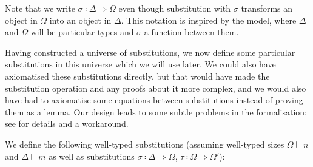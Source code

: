 Note that we write $σ ∶ Δ ⇒ Ω$ even though substitution with $σ$ transforms an
object in $Ω$ into an object in $Δ$. This notation is inspired by the model,
where $Δ$ and $Ω$ will be particular types and $σ$ a function between them.

Having constructed a universe of substitutions, we now define some particular
substitutions in this universe which we will use later. We could also have
axiomatised these substitutions directly, but that would have made the
substitution operation and any proofs about it more complex, and we would also
have had to axiomatise some equations between substitutions instead of proving
them as a lemma. Our design leads to some subtle problems in the formalisation;
see  for details and a workaround.

We define the following well-typed substitutions (assuming well-typed sizes $Ω ⊢
n$ and $Δ ⊢ m$ as well as substitutions $σ ∶ Δ ⇒ Ω$, $τ ∶ Ω ⇒ Ω′$):

